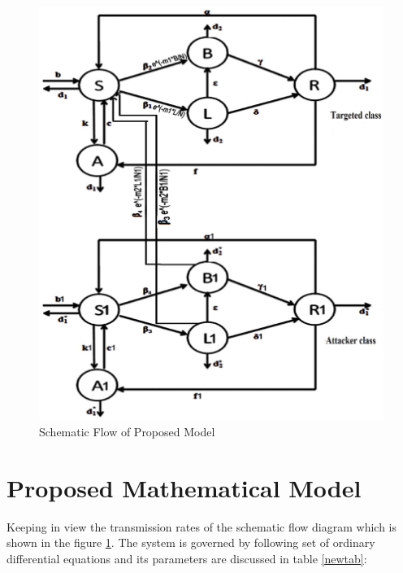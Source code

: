 \documentclass[conference]{IEEEtran}
\begin{document}
\begin{figure}[h]
  \centering
  \includegraphics[width=1.3\columnwidth, clip=true]{modelcopy1.eps}
  \caption{Schematic Flow of Proposed Model}\label{sf1}
 \end{figure}


\normalfont

\section{Proposed Mathematical Model}
Keeping in view the transmission rates of the schematic flow diagram which is shown in the figure \ref{sf1}. The system is governed by following set of ordinary differential equations and its parameters are discussed in table \ref{newtab}:\\
\end{document}
